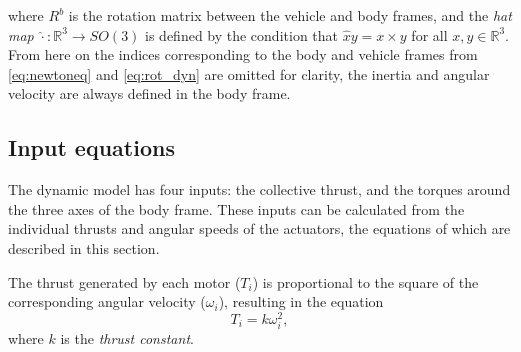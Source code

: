 where $R^b$ is the rotation matrix between the vehicle and body frames, and the \textit{hat map} $\hat{\cdot}:\mathbb{R}^3\rightarrow SO(3)$ is defined by the condition that $\hat{x}y = x\times y$ for all $x,y\in \mathbb{R}^3$. From here on the indices corresponding to the body and vehicle frames from \eqref{eq:newtoneq} and \eqref{eq:rot_dyn} are omitted for clarity, the inertia and angular velocity are always defined in the body frame. %

\subsection{Input equations}
The dynamic model has four inputs: the collective thrust, and the torques around the three axes of the body frame. These inputs can be calculated from the individual thrusts and angular speeds of the actuators, the equations of which are described in this section.

The thrust generated by each motor ($T_i$) is proportional to the square of the corresponding angular velocity ($\omega_i$), resulting in the equation
\begin{equation}
T_i = k\omega_i^2,\label{eq:thrustconstant}
\end{equation}
where $k$ is the \textit{thrust constant}. 



